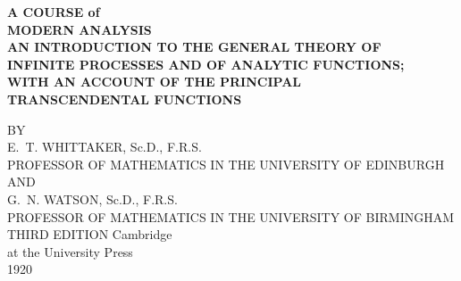 \begin{center}
\bfseries
\LARGE A COURSE of\\[12pt]
\Huge MODERN ANALYSIS\\[12pt]
\normalsize AN INTRODUCTION TO THE GENERAL THEORY OF\\
\normalsize INFINITE PROCESSES AND OF ANALYTIC FUNCTIONS;\\
\normalsize WITH AN ACCOUNT OF THE PRINCIPAL\\
\normalsize TRANSCENDENTAL FUNCTIONS

\par
\vfil

\normalfont
\normalsize BY \\
\bigskip
\Large E.~T. WHITTAKER, Sc.D., F.R.S.\\
\footnotesize PROFESSOR OF MATHEMATICS IN THE UNIVERSITY OF EDINBURGH\\
\bigskip
\footnotesize AND\\
\bigskip
\Large G.~N. WATSON, Sc.D., F.R.S.\\
\footnotesize PROFESSOR OF MATHEMATICS IN THE UNIVERSITY OF BIRMINGHAM
\vfil\vfil
\textsf{THIRD EDITION}
\vfil\vfil\vfil
\Large Cambridge \\
at the University Press \\
1920
\end{center}
\clearpage